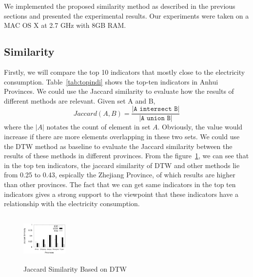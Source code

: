 We implemented the proposed similarity method as described in the previous sections and presented the experimental results. Our experiments were taken on a MAC OS X at 2.7 GHz with 8GB RAM.
\subsection{Similarity}
Firstly, we will compare the top 10 indicators that mostly close to the electricity consumption. Table~\ref{tab:topindi} shows the top-ten indicators in Anhui Provinces. We could use the Jaccard similarity to evaluate how the results of different methods are relevant. Given set A and B, 
\begin{equation}
	Jaccard(A, B) = \frac{\texttt{|A intersect B|}}{\texttt{|A union B|}}
\end{equation} 
where the $|A|$ notates the count of element in set $A$. Obviously, the value would increase if there are more elements overlapping in these two sets. We could use the DTW method as baseline to evaluate the Jaccard similarity between the results of these methods in different provinces. From the figure~\ref{fig:Jaccard}, we can see that in the top ten indicators, the jaccard similarity of DTW and other methods lie from 0.25 to 0.43, espically the Zhejiang Province, of which results are higher than other provinces. The fact that we can get same indicators in the top ten indicators gives a strong support to the viewpoint that these indicators have a relationship with the electricity consumption.



%
%

\begin{figure}
	\centering
	\includegraphics[height=1in, width=0.9in]{dtw_jaccard_similarity}
	\caption{Jaccard Similarity Based on DTW}
	\label{fig:Jaccard}
\end{figure}

